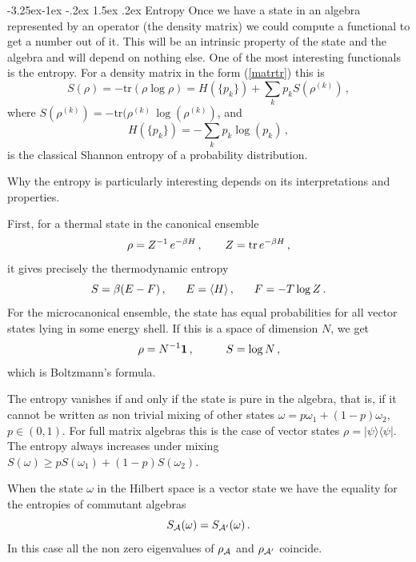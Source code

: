\documentclass[11pt,a4paper]{article}
\makeatletter
\renewcommand\subsection{\@startsection{subsection}{2}{\z@}%
                                   {-3.25ex\@plus -1ex \@minus -.2ex}%
                                     {1.5ex \@plus .2ex}%
                                     {\normalfont\bfseries}}
\numberwithin{equation}{section}
\newcommand{\be}{\begin{equation}}
\newcommand{\ee}{\end{equation}}
\makeatother
\begin{document}
\subsection{Entropy}
Once we have a state in an algebra represented by an operator (the density matrix) we could compute a functional to get a number out of it. This will be an intrinsic property of the state and the algebra and will depend on nothing else. One of the most interesting functionals is the entropy. For a density matrix in the form (\ref{matrtr}) this is   
\begin{equation}
S(\rho)=-\textrm{tr}(\rho\log \rho)=H(\{p_k\})+\sum_k p_k S(\rho^{(k)})\,,
\end{equation}
where $S(\rho^{(k)})=-\textrm{tr}(\rho^{(k)} \, \log(\rho^{(k)})$, and
\begin{equation}
H(\{p_k\})=-\sum_k p_k \log(p_k)\,,
\end{equation}
is the classical Shannon entropy of a probability distribution. 

Why the entropy is particularly interesting depends on its interpretations and properties. 

First, for a thermal state in the canonical ensemble 
\be
\rho=Z^{-1}\, e^{-\beta H}\,,\hspace{.7cm} Z=\textrm{tr} \, e^{-\beta H}\,,
\ee
it gives precisely the thermodynamic entropy
\be 
S= \beta (E-F) \,,\hspace{.6cm} E= \langle H\rangle\,,\hspace{.6cm} F=-T \log Z\,.
\ee
For the microcanonical ensemble, the state has equal probabilities for all vector states lying in some energy shell. If this is a space of dimension $N$, we get
\be
\rho= N^{-1} {\bf 1}\,,\hspace{1cm} S=\log N\,,
\ee
which is Boltzmann's formula. 

The entropy vanishes if and only if the state is pure in the algebra, that is, if it cannot be written as non trivial mixing of other states $\omega= p \omega_1+(1-p) \omega_2$, $p\in (0,1)$. For full matrix algebras this is the case of vector states $\rho=|\psi\rangle \langle\psi|$. The entropy always increases under mixing $S(\omega)\ge  p S(\omega_1)+(1-p) S(\omega_2)$. 

When the state $\omega$ in the Hilbert space is a vector state we have the equality for the entropies of commutant algebras 
\begin{equation}
S_{{\cal A}}(\omega)=S_{{\cal A}'}(\omega)\,.
\end{equation}
In this case all the non zero eigenvalues of $\rho_{\cal A}$ and $\rho_{{\cal A}'}$ coincide.
\end{document}
